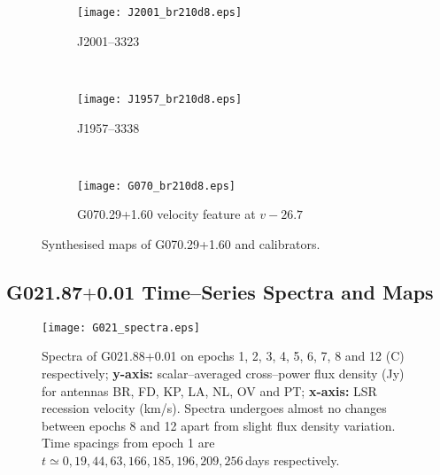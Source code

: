         	\begin{figure}[h]
        		\begin{subfigure}[t]{0.3\textwidth}
        			\texttt{[image: J2001\_br210d8.eps]}
        			\caption{J2001--3323}
        		\end{subfigure}
        		~
        		\begin{subfigure}[t]{0.3\textwidth}
        			\texttt{[image: J1957\_br210d8.eps]}
        			\caption{J1957--3338}
        		\end{subfigure}
        		~
        		\begin{subfigure}[t]{0.3\textwidth}
        			\texttt{[image: G070\_br210d8.eps]}
        			\caption[G070.29$+$1.60 maps]{G070.29+1.60 velocity feature at $v-26.7$\,\kms}
        		\end{subfigure}
        		\caption[G070.29+1.60 maps]{Synthesised maps of G070.29+1.60 and calibrators.}
        		\label{fig:g70_ref}
        	\end{figure}

        \clearpage
        \subsection{G021.87$+$0.01 Time--Series Spectra and Maps}
         
			\begin{figure}[H]
				\centering
				\texttt{[image: G021\_spectra.eps]}
				\caption[G021.87+0.01 spectra]{Spectra of G021.88+0.01 on epochs 1, 2, 3, 4, 5, 6, 7, 8 and 12 (C) respectively; {\bf y-axis:} scalar--averaged cross--power flux density (Jy) for antennas BR, FD, KP, LA, NL, OV and PT; {\bf x-axis:} LSR recession velocity (km/s). Spectra undergoes almost no changes between epochs 8 and 12 apart from slight flux density variation. Time spacings from epoch 1 are $t\simeq0,19,44,63,166,185,196, 209, 256$\,days respectively.} \label{fig:g021_spectra}
			\end{figure}
        
